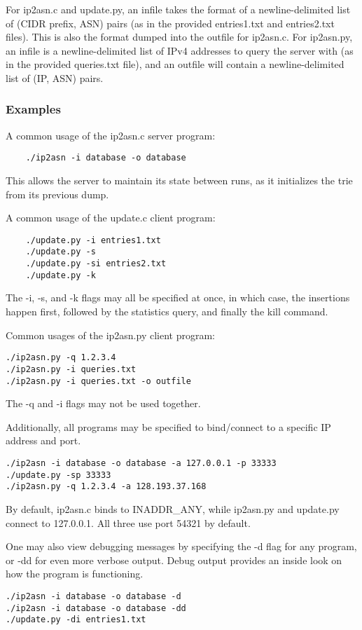 \documentclass[letterpaper,10pt,fleqn]{article}
\numberwithin{equation}{section}
\begin{document}
For ip2asn.c and update.py, an infile takes the format of a newline-delimited list of (CIDR prefix, ASN) pairs (as in the provided entries1.txt and entries2.txt files).  This is also the format dumped into the outfile for ip2asn.c.  For ip2asn.py, an infile is a newline-delimited list of IPv4 addresses to query the server with (as in the provided queries.txt file), and an outfile will contain a newline-delimited list of (IP, ASN) pairs.

\subsubsection*{Examples}
A common usage of the ip2asn.c server program:
\begin{verbatim}
    ./ip2asn -i database -o database
\end{verbatim}
This allows the server to maintain its state between runs, as it initializes the trie from its previous dump.

A common usage of the update.c client program:
\begin{verbatim}
    ./update.py -i entries1.txt
    ./update.py -s
    ./update.py -si entries2.txt
    ./update.py -k
\end{verbatim}
The -i, -s, and -k flags may all be specified at once, in which case, the insertions happen first, followed by the statistics query, and finally the kill command.

Common usages of the ip2asn.py client program:
\begin{verbatim}
./ip2asn.py -q 1.2.3.4
./ip2asn.py -i queries.txt
./ip2asn.py -i queries.txt -o outfile
\end{verbatim}
The -q and -i flags may not be used together.

Additionally, all programs may be specified to bind/connect to a specific IP address and port.
\begin{verbatim}
./ip2asn -i database -o database -a 127.0.0.1 -p 33333
./update.py -sp 33333
./ip2asn.py -q 1.2.3.4 -a 128.193.37.168
\end{verbatim}
By default, ip2asn.c binds to INADDR\_ANY, while ip2asn.py and update.py connect to 127.0.0.1.  All three use port 54321 by default.

One may also view debugging messages by specifying the -d flag for any program, or -dd for even more verbose output.  Debug output provides an inside look on how the program is functioning.
\begin{verbatim}
./ip2asn -i database -o database -d
./ip2asn -i database -o database -dd
./update.py -di entries1.txt
\end{verbatim}
\end{document}
